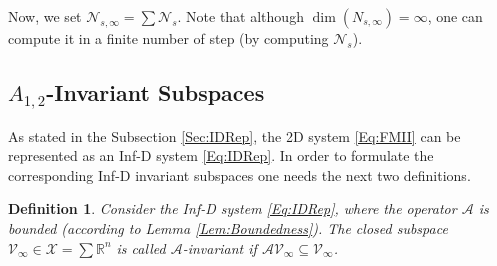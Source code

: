 \documentclass[journal,12pt,draftcls,onecolumn]{IEEEtran}
\newcommand{\ssp}[1]{\mathscr{#1}}      \newcommand{\setssp}[1]{\mathfrak{#1}}   \newcommand{\fld}[1]{\mathbb{#1}}       \newcommand{\op}[1]{\mathcal{#1}}       \newcommand{\sumbanach}[1]{\sum{#1}}
\newcommand{\infd}{Inf-D }
\def\QEDclosed{\hfill\IEEEQEDclosed}
\renewcommand{\qed}{\QEDclosed}
\newtheorem{definition}{Definition}
\begin{document}
Now, we set $\ssp{N}_{s,\infty} = \sumbanach{\ssp{N}_s}$. Note that although $\dim({N}_{s,\infty})=\infty$, one can compute it in a finite number of step (by computing $\ssp{N}_s$).

\subsection{$A_{1,2}$-Invariant Subspaces}\label{Sec:A12Inv}
As stated in the Subsection \ref{Sec:IDRep}, the 2D system \eqref{Eq:FMII} can be represented as an \infd system \eqref{Eq:IDRep}. In order to formulate the corresponding Inf-D invariant subspaces one needs the next two definitions.
\begin{definition}\cite{Zwart_Book}\label{Def:AID_Inv}
	Consider the \infd system \eqref{Eq:IDRep}, where the operator $\op{A}$ is bounded (according to Lemma \ref{Lem:Boundedness}). The closed subspace $\ssp{V}_\infty\in\op{X} = \sum\fld{R}^n$ is called $\op{A}$-invariant if $\op{A}\ssp{V}_\infty\subseteq\ssp{V}_\infty$.\qed
\end{definition}
\end{document}

